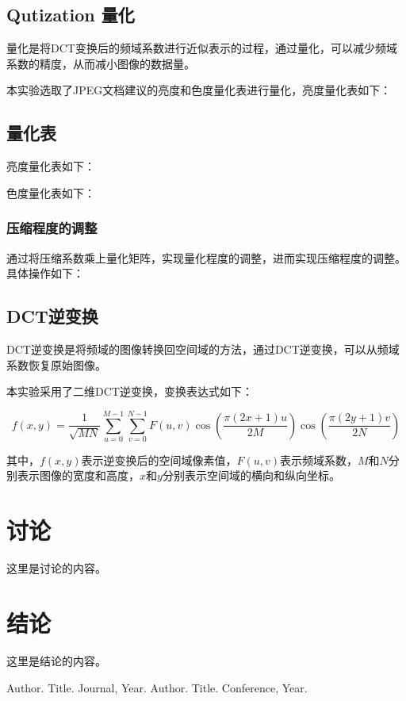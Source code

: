 \documentclass{article}
\begin{document}
\subsection{Qutization 量化}

量化是将DCT变换后的频域系数进行近似表示的过程，通过量化，可以减少频域系数的精度，从而减小图像的数据量。

本实验选取了JPEG文档建议的亮度和色度量化表进行量化，亮度量化表如下：
\subsection{量化表}

亮度量化表如下：



色度量化表如下：



\subsubsection{压缩程度的调整}

通过将压缩系数乘上量化矩阵，实现量化程度的调整，进而实现压缩程度的调整。具体操作如下：



\subsection{DCT逆变换}

DCT逆变换是将频域的图像转换回空间域的方法，通过DCT逆变换，可以从频域系数恢复原始图像。

本实验采用了二维DCT逆变换，变换表达式如下：

\[
f(x,y) = \frac{1}{\sqrt{MN}} \sum_{u=0}^{M-1} \sum_{v=0}^{N-1} F(u,v) \cos\left(\frac{\pi(2x+1)u}{2M}\right) \cos\left(\frac{\pi(2y+1)v}{2N}\right)
\]

其中，$f(x,y)$表示逆变换后的空间域像素值，$F(u,v)$表示频域系数，$M$和$N$分别表示图像的宽度和高度，$x$和$y$分别表示空间域的横向和纵向坐标。


\section{讨论}

这里是讨论的内容。

\section{结论}

这里是结论的内容。

\begin{thebibliography}{9}
 Author. Title. Journal, Year.
 Author. Title. Conference, Year.
\end{thebibliography}
\end{document}
